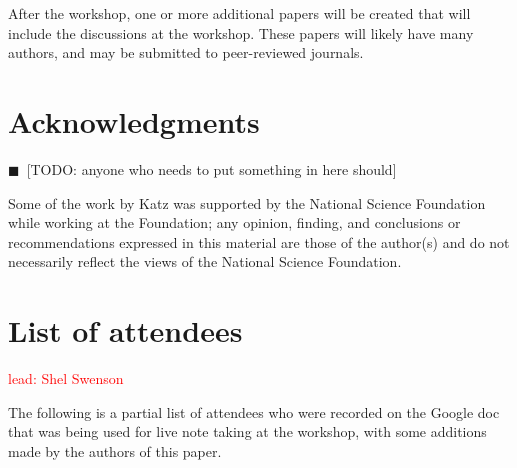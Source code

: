 \documentclass[11pt, oneside]{amsart}
\newcommand{\todo}[1]{{\color{blue}$\blacksquare$~\textsf{[TODO: #1]}}}
\newcommand{\note}[1]{ {\textcolor{red}    { #1 }}}
\begin{document}
After the workshop, one or more additional papers will be created that
will include the discussions at the workshop. These papers will likely
have many authors, and may be submitted to peer-reviewed journals.


\section*{Acknowledgments}

\todo{anyone who needs to put something in here should}

Some of the work by Katz was
supported by the National Science Foundation while working at the
Foundation; any opinion, finding, and conclusions or recommendations
expressed in this material are those of the author(s) and do not
necessarily reflect the views of the National Science Foundation.


\appendix
\section{List of attendees}

\note{lead: Shel Swenson}

The following is a partial list of attendees who were recorded on the
Google doc~\cite{WSSSPE1-google-notes} that was being used for live note taking at the workshop, with some additions made by the authors of this paper.
\end{document}
